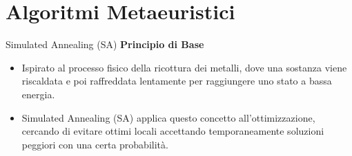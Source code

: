 \documentclass{beamer}
\begin{document}
\section{Algoritmi Metaeuristici}
\begin{frame}{Simulated Annealing (SA)}
    \textbf{Principio di Base}
    \begin{itemize}
        \item Ispirato al processo fisico della ricottura dei metalli, dove una sostanza viene riscaldata e poi raffreddata lentamente per raggiungere uno stato a bassa energia.
        \item Simulated Annealing (SA) applica questo concetto all'ottimizzazione, cercando di evitare ottimi locali accettando temporaneamente soluzioni peggiori con una certa probabilità.
    \end{itemize}


\end{frame}
\end{document}
